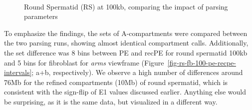 \documentclass[
  11pt,
  a4paper,
]{scrbook}
\let\oldemph\emph
\renewcommand\emph[1]{\oldemph{\color{gray}#1}}
\begin{document}
\begin{figure}
\begin{minipage}{0.46\linewidth}


\end{minipage}%
%
\begin{minipage}{0.46\linewidth}



\end{minipage}%
%
\begin{minipage}{0.05\linewidth}
~\end{minipage}%

\caption{\label{fig-rs100-recpe-pe}Round Spermatid (RS) at 100kb,
comparing the impact of parsing parameters}

\end{figure}%

To emphasize the findings, the sets of A-compartments were compared
between the two parsing runs, showing almost identical compartment
calls. Additionally, the set difference was 8 bins between PE and recPE
for round spermatid 100kb and 5 bins for fibroblast for \emph{arms}
viewframe (Figure~\ref{fig-rs-fb-100-pe-recpe-intervals}; a+b,
respectively). We observe a high number of differences around 76Mb for
the refined compartments (10Mb) of round spermatid, which is consistent
with the sign-flip of E1 values discussed earlier. Anything else would
be surprising, as it is the same data, but visualized in a different
way.
\end{document}
